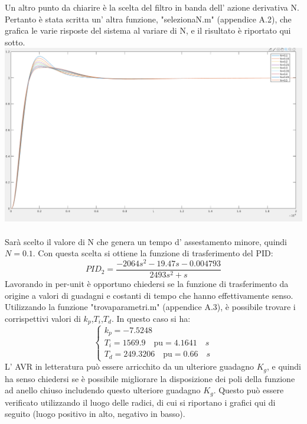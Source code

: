 \documentclass[Lau,noexaminfo]{sapthesis}
\begin{document}
	Un altro punto da chiarire è la scelta del filtro in banda dell' azione derivativa N. Pertanto è stata scritta un' altra funzione, "seleziona\textunderscore N.m" (appendice A.2), che grafica le varie risposte del sistema al variare di N, e il risultato è riportato qui sotto.\\
	\includegraphics[height=0.55\textheight,angle=-90]{vari_N}\\\\
	Sarà scelto il valore di N che genera un tempo d' assestamento minore, quindi $N=0.1$. Con questa scelta si ottiene la funzione di trasferimento del PID:
	\begin{equation*}
	PID_2=\frac{-2064s^2-19.47s-0.004793}{2493s^2+s}
	\end{equation*}
	Lavorando in per-unit è opportuno chiedersi se la funzione di trasferimento da origine a valori di guadagni e costanti di tempo che hanno effettivamente senso. Utilizzando la funzione "trova\textunderscore parametri.m" (appendice A.3), è possibile trovare i corrispettivi valori di $k_p$,$T_i$,$T_d$. In questo caso si ha:\\
	\[
	\begin{cases}
	k_p=-7.5248\\
	T_i=1569.9 \quad\text{pu}=4.1641\quad s\\
	T_d=249.3206\quad \text{pu}=0.66\quad s
	\end{cases}
	\]
	L' AVR in letteratura può essere arricchito da un ulteriore guadagno $K_g$, e quindi ha senso chiedersi se è possibile migliorare la disposizione dei poli della funzione ad anello chiuso includendo questo ulteriore guadagno $K_g$. Questo può essere verificato utilizzando il luogo delle radici, di cui si riportano i grafici qui di seguito (luogo positivo in alto, negativo in basso).\\\\
\end{document}
